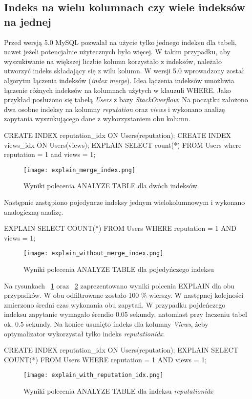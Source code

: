 \subsection{Indeks na wielu kolumnach czy wiele indeksów na jednej}
Przed wersją 5.0 MySQL pozwalał na użycie tylko jednego indeksu dla tabeli, nawet jeżeli potencjalnie użytecznych było więcej. W takim przypadku, aby wyszukiwanie na większej liczbie kolumn korzystało z indeksów, należało utworzyć indeks składający się z wilu kolumn. W wersji 5.0 wprowadzony został algorytm łączenia indeksów (\textit{index merge}). Idea łączenia indeksów umożliwia łączenie różnych indeksów na kolumnach użytych w klauzuli WHERE. Jako przykład posłużono się tabelą \textit{Users} z bazy \textit{StackOverflow}. Na początku założono dwa osobne indeksy na kolumny \textit{reputation} oraz \textit{views} i wykonano analizę zapytania wyszukującego dane z wykorzystaniem obu kolumn.
\begin{spverbatim}
	CREATE INDEX reputation_idx ON Users(reputation);
	CREATE INDEX views_idx ON Users(views);
	EXPLAIN SELECT count(*) FROM Users where reputation = 1 and views = 1;
\end{spverbatim}
\begin{figure}
	\centering
	\texttt{[image: explain\_merge\_index.png]}
	\caption{Wyniki polecenia ANALYZE TABLE dla dwóch indeksów}
	\label{fig:explain_merge_index}
\end{figure}

Następnie zastąpiono pojedyncze indeksy jednym wielokolumnowym i wykonano analogiczną analizę.
\begin{spverbatim}
	EXPLAIN SELECT COUNT(*) FROM Users WHERE reputation = 1 AND views = 1;
\end{spverbatim}

\begin{figure}
	\centering
	\texttt{[image: explain\_without\_merge\_index.png]}
	\caption{Wyniki polecenia ANALYZE TABLE dla pojedyńczego indeksu}
	\label{fig:explain_without_merge_index}
\end{figure}

Na rysunkach ~\ref{fig:explain_merge_index} oraz ~\ref{fig:explain_without_merge_index} zaprezentowano wyniki polcenia EXPLAIN dla obu przypadków. W obu odfiltrowane zostało 100 \% wierszy. W następnej kolejności zmierzono średni czas wykonania obu zapytań. W przypadku pojdeńczego indeksu zapytanie wymagało śrendio 0.05 sekundy, natomiast przy łaczeniu tabel ok. 0.5 sekundy. Na koniec usunięto indeks dla kolumny \textit{Views}, żeby optymalizator wykorzystał tylko indeks \textit{reputation\textunderscore idx}.
\begin{spverbatim}
	CREATE INDEX reputation_idx ON Users(reputation);
	EXPLAIN SELECT COUNT(*) FROM Users WHERE reputation = 1 AND views = 1;
\end{spverbatim}
\begin{figure}[h!]
	\centering
	\texttt{[image: explain\_with\_reputation\_idx.png]}
	\caption{Wyniki polecenia ANALYZE TABLE dla indeksu \textit{reputation\textunderscore idx}}
	\label{fig:explain_with_reputation_idx}
\end{figure}

